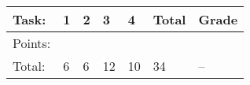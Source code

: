 {\begin{tabular}{lllllll}
\hline
 Task:   & 1   & 2   & 3   & 4   & Total   & Grade   \\
\hline
 Points: &     &     &     &     &         &         \\
 Total:  & 6   & 6   & 12  & 10  & 34      & --      \\
\hline
\end{tabular}}